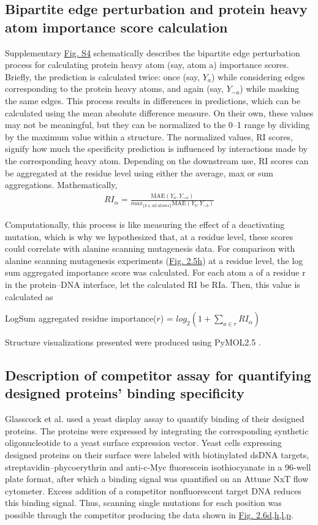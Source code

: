\subsection{Bipartite edge perturbation and protein heavy atom importance score calculation}
Supplementary \hyperref[fig:pdnaS4]{Fig. S4} schematically describes the bipartite edge perturbation process for calculating protein heavy atom (say, atom a) importance scores. Briefly, the prediction is calculated twice: once (say, $Y_a$) while considering edges corresponding to the protein heavy atoms, and again (say, $Y_{\sim a}$) while masking the same edges. This process results in differences in predictions, which can be calculated using the mean absolute difference measure. On their own, these values may not be meaningful, but they can be normalized to the 0–1 range by dividing by the maximum value within a structure. The normalized values, RI scores, signify how much the specificity prediction is influenced by interactions made by the corresponding heavy atom. Depending on the downstream use, RI scores can be aggregated at the residue level using either the average, max or sum aggregations. Mathematically,
\begin{align} 
RI_\alpha = 
\frac{\text{MAE}(Y_a,Y_{\sim a})}
{max_{\{b\in all\ atoms\}}\text{MAE}(Y_b,Y_{\sim b})}
\end{align}
\par
Computationally, this process is like measuring the effect of a deactivating mutation, which is why we hypothesized that, at a residue level, these scores could correlate with alanine scanning mutagenesis data. For comparison with alanine scanning mutagenesis experiments (\hyperref[fig:pdna4]{Fig. 2.5h}) at a residue level, the log sum aggregated importance score was calculated. For each atom a of a residue r in the protein–DNA interface, let the calculated RI be RIa. Then, this value is calculated as
\begin{center}
LogSum aggregated residue importance($r$) = $log_2(1 + \sum\limits_{a\in r}RI_\alpha)$ %
\end{center}
Structure visualizations presented were produced using PyMOL2.5 \citep{pymol}.

\subsection{Description of competitor assay for quantifying designed proteins’ binding specificity}

Glasscock et al. \citep{Glasscock2023} used a yeast display assay to quantify binding of their designed proteins. The proteins were expressed by integrating the corresponding synthetic oligonucleotide to a yeast surface expression vector. Yeast cells expressing designed proteins on their surface were labeled with biotinylated dsDNA targets, streptavidin–phycoerythrin and anti-c-Myc fluorescein isothiocyanate in a 96-well plate format, after which a binding signal was quantified on an Attune NxT flow cytometer. Excess addition of a competitor nonfluorescent target DNA reduces this binding signal. Thus, scanning single mutations for each position was possible through the competitor producing the data shown in \hyperref[fig:pdna5]{Fig. 2.6d,h,l,p}.
\\
